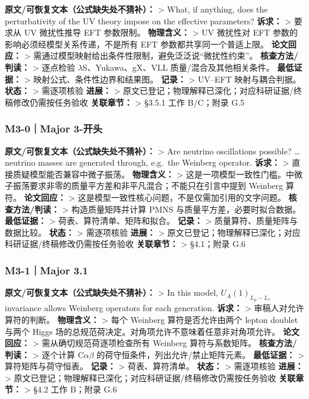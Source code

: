 \documentclass[
  chinese,
  UTF8]{ctexart}
\begin{document}
\textbf{原文/可恢复文本（公式缺失处不猜补）：} \textgreater{} What, if
anything, does the perturbativity of the UV theory impose on the
effective parameters? \textbf{诉求：} \textgreater{} 要求从 UV
微扰性推导 EFT 参数限制。 \textbf{物理含义：} \textgreater{} UV 微扰性对
EFT 参数的影响必须经模型关系传递，不是所有 EFT
参数都共享同一个普适上限。 \textbf{论文回应：} \textgreater{}
需通过模型映射给出条件性限制，避免泛泛说``微扰性约束''。
\textbf{核查方法/判读：} \textgreater{} 逐点检验
\ensuremath{\lambda}S、Yukawa、gX、VLL 质量/混合及其他相关条件。
\textbf{最低证据：} \textgreater{} 映射公式、条件性边界和结果图。
\textbf{记录：} \textgreater{} UV--EFT 映射与耦合判据。 \textbf{状态：}
\textgreater{} 需逐项核验 \textbf{进展：} \textgreater{}
原文已登记；物理解释已深化；对应科研证据/终稿修改仍需按任务验收
\textbf{关联章节：} \textgreater{} §3.5.1 工作 B/C；附录 G.5

\subsubsection{M3-0｜Major 3-开头}\label{m3-0major-3-ux5f00ux5934}

\textbf{原文/可恢复文本（公式缺失处不猜补）：} \textgreater{} Are
neutrino oscillations possible? \ldots{} neutrino masses are generated
through, e.g.~the Weinberg operator. \textbf{诉求：} \textgreater{}
直接质疑模型能否兼容中微子振荡。 \textbf{物理含义：} \textgreater{}
这是一项模型一致性门槛。中微子振荡要求非零的质量平方差和非平凡混合；不能只在引言中提到
Weinberg 算符。 \textbf{论文回应：} \textgreater{}
这是模型一致性核心问题，不是仅需加引用的文字问题。
\textbf{核查方法/判读：} \textgreater{} 构造质量矩阵并计算 PMNS
与质量平方差，必要时拟合数据。 \textbf{最低证据：} \textgreater{}
荷表、算符清单、矩阵和拟合。 \textbf{记录：} \textgreater{}
质量算符、质量矩阵与数据比较。 \textbf{状态：} \textgreater{} 需逐项核验
\textbf{进展：} \textgreater{}
原文已登记；物理解释已深化；对应科研证据/终稿修改仍需按任务验收
\textbf{关联章节：} \textgreater{} §4.1；附录 G.6

\subsubsection{M3-1｜Major 3.1}\label{m3-1major-3.1}

\textbf{原文/可恢复文本（公式缺失处不猜补）：} \textgreater{} In this
model, \(U_A(1)_{L_{\mu}-L_{\tau}}\) invariance allows Weinberg
operators for each generation. \textbf{诉求：} \textgreater{}
审稿人对允许算符的判断。 \textbf{物理含义：} \textgreater{} 每个
Weinberg 算符是否允许由两个 lepton doublet 与两个 Higgs
场的总规范荷决定。对角项允许不意味着任意非对角项允许。
\textbf{论文回应：} \textgreater{} 需从确切规范荷逐项检查所有 Weinberg
算符与系数矩阵。 \textbf{核查方法/判读：} \textgreater{} 逐个计算
C\ensuremath{\alpha}\ensuremath{\beta}
的荷守恒条件，列出允许/禁止矩阵元素。 \textbf{最低证据：} \textgreater{}
算符矩阵与荷守恒表。 \textbf{记录：} \textgreater{} 荷表、算符清单。
\textbf{状态：} \textgreater{} 需逐项核验 \textbf{进展：} \textgreater{}
原文已登记；物理解释已深化；对应科研证据/终稿修改仍需按任务验收
\textbf{关联章节：} \textgreater{} §4.2 工作 B；附录 G.6
\end{document}
